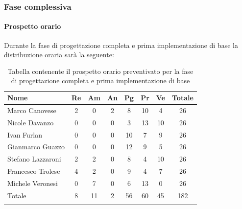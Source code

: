 \subsubsection{Fase complessiva}
\paragraph{Prospetto orario}
Durante la fase di progettazione completa e prima implementazione di base la distribuzione oraria sarà la seguente:

\begin{longtable}{|l|c|c|c|c|c|c|c|}
	\hline
	\rowcolor{lighter-grayer}
	\textbf{Nome}     & \textbf{Re} & \textbf{Am} & \textbf{An} & \textbf{Pg} & \textbf{Pr} & \textbf{Ve} & \textbf{Totale} \\
	\hline
	\endfirsthead

	\hline
	Marco Canovese    & 2           & 0           & 2           & 8           & 10          & 4           & 26              \\
	\hline
	\hline
	Nicole Davanzo    & 0           & 0           & 0           & 3           & 13          & 10          & 26              \\
	\hline
	\hline
	Ivan Furlan       & 0           & 0           & 0           & 10          & 7           & 9           & 26              \\
	\hline
	\hline
	Gianmarco Guazzo  & 0           & 0           & 0           & 12          & 9           & 5           & 26              \\
	\hline
	\hline
	Stefano Lazzaroni & 2           & 2           & 0           & 8           & 4           & 10          & 26              \\
	\hline
	\hline
	Francesco Trolese & 4           & 2           & 0           & 9           & 4           & 7           & 26              \\
	\hline
	\hline
	Michele Veronesi  & 0           & 7           & 0           & 6           & 13          & 0           & 26              \\
	\hline
	\hline
	Totale            & 8           & 11          & 2           & 56          & 60          & 45          & 182             \\
	\hline
	\rowcolor{white}
	\caption{Tabella contenente il prospetto orario preventivato per la fase di progettazione completa e prima implementazione di base}
\end{longtable}


